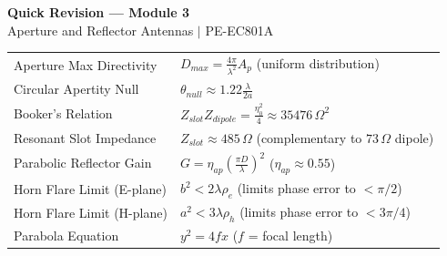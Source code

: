 \documentclass[12pt,a4paper]{article}
\renewcommand{\arraystretch}{1.45}
\begin{document}
\newpage
\begin{center}
  {\large\bfseries\color{myred} Quick Revision --- Module 3}\\[3pt]
  {\small\color{mydark} Aperture and Reflector Antennas $|$ PE-EC801A}
\end{center}
\noindent{\color{myred}\rule{\linewidth}{1.2pt}}
\vspace{4pt}

\begin{tcolorbox}[formulabox, title={\textbf{Key Formulas and Metrics at a Glance}}]
\renewcommand{\arraystretch}{1.35}
\begin{tabularx}{\linewidth}{B{5.2cm} X}
Aperture Max Directivity & $D_{max} = \frac{4\pi}{\lambda^2} A_p$ \quad (uniform distribution) \\[4pt]
Circular Apertity Null & $\theta_{null} \approx 1.22 \frac{\lambda}{2a}$ \\[4pt]
Booker's Relation & $Z_{slot} Z_{dipole} = \frac{\eta_0^2}{4} \approx 35476\,\Omega^2$ \\[4pt]
Resonant Slot Impedance & $Z_{slot} \approx 485\,\Omega$ \quad (complementary to $73\,\Omega$ dipole) \\[4pt]
Parabolic Reflector Gain & $G = \eta_{ap} \left(\frac{\pi D}{\lambda}\right)^2$ \quad ($\eta_{ap} \approx 0.55$) \\[4pt]
Horn Flare Limit (E-plane) & $b^2 < 2\lambda\rho_e$ \quad (limits phase error to $< \pi/2$) \\[4pt]
Horn Flare Limit (H-plane) & $a^2 < 3\lambda\rho_h$ \quad (limits phase error to $< 3\pi/4$) \\[4pt]
Parabola Equation & $y^2 = 4fx$ \quad ($f$ = focal length) \\
\end{tabularx}
\end{tcolorbox}
\end{document}
